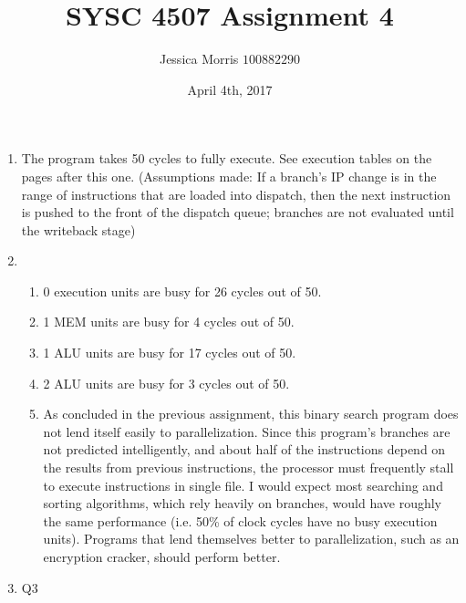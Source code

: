 \documentclass{article}
\title{SYSC 4507 Assignment 4}
\date{April 4th, 2017}
\author{Jessica Morris \(100882290\)}
\begin{document}
\maketitle

\begin{enumerate}

\item The program takes 50 cycles to fully execute. See execution tables on the pages after this one. (Assumptions made: If a branch's IP change is in the range of instructions that are loaded into dispatch, then the next instruction is pushed to the front of the dispatch queue; branches are not evaluated until the writeback stage)

\item
\begin{enumerate}
\item 0 execution units are busy for 26 cycles out of 50.
\item 1 MEM units are busy for 4 cycles out of 50.
\item 1 ALU units are busy for 17 cycles out of 50.
\item 2 ALU units are busy for 3 cycles out of 50.
\item As concluded in the previous assignment, this binary search program does not lend itself easily to parallelization. Since this program's branches are not predicted intelligently, and about half of the instructions depend on the results from previous instructions, the processor must frequently stall to execute instructions in single file. I would expect most searching and sorting algorithms, which rely heavily on branches, would have roughly the same performance (i.e. 50\% of clock cycles have no busy execution units). Programs that lend themselves better to parallelization, such as an encryption cracker, should perform better. 
\end{enumerate}

\item Q3

\end{enumerate}
\end{document}
